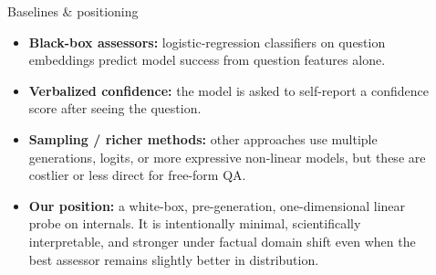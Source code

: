 \documentclass[final]{beamer}
\newlength{\sepwidth}
\newlength{\leftcolwidth}
\newlength{\maincolwidth}
\newcommand{\separatorcolumn}{\begin{column}{\sepwidth}\end{column}}
\begin{document}
\begin{frame}[t]
\begin{columns}[t]
\begin{column}{\leftcolwidth}
\begin{block}{Baselines \& positioning}
\begin{itemize}
\item \textbf{Black-box assessors:} logistic-regression classifiers on question embeddings predict model success from question features alone.
\item \textbf{Verbalized confidence:} the model is asked to self-report a confidence score after seeing the question.
\item \textbf{Sampling / richer methods:} other approaches use multiple generations, logits, or more expressive non-linear models, but these are costlier or less direct for free-form QA.
\item \textbf{Our position:} a white-box, pre-generation, one-dimensional linear probe on internals. It is intentionally minimal, scientifically interpretable, and stronger under factual domain shift even when the best assessor remains slightly better in distribution.
\end{itemize}
\end{block}

\end{column}

\separatorcolumn

\begin{column}{\maincolwidth}


\end{column}
\end{columns}
\end{frame}
\end{document}
